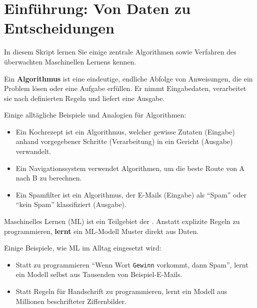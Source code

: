 \chapter{Einführung: Von Daten zu Entscheidungen}
\label{chap:einfuehrung}

In diesem Skript lernen Sie einige zentrale Algorithmen sowie Verfahren des überwachten Maschinellen Lernens kennen.

\begin{mydefinition}[Algorithmus]
Ein \textbf{Algorithmus} ist eine eindeutige, endliche Abfolge von Anweisungen, die ein Problem lösen oder eine Aufgabe erfüllen. Er nimmt Eingabedaten, verarbeitet sie nach definierten Regeln und liefert eine Ausgabe.
\end{mydefinition}

\begin{myexample}
Einige alltägliche Beispiele und Analogien für Algorithmen:
\begin{itemize}
    \item Ein Kochrezept ist ein Algorithmus, welcher gewisse Zutaten (Eingabe) anhand vorgegebener Schritte (Verarbeitung) in ein Gericht (Ausgabe) verwandelt.
    \item Ein Navigationssystem verwendet Algorithmen, um die beste Route von A nach B zu berechnen.
    \item Ein Spamfilter ist ein Algorithmus, der E-Mails (Eingabe) als \enquote{Spam} oder \enquote{kein Spam} klassifiziert (Ausgabe).
\end{itemize}
\end{myexample}

\begin{mydefinition}[\acrfull{ML}]
Maschinelles Lernen (\acrshort{ML}) ist ein Teilgebiet der .
Anstatt explizite Regeln zu programmieren, \textbf{lernt} ein \gls{ML}-Modell
Muster direkt aus Daten.
\end{mydefinition}

\begin{myexample}
    Einige Beispiele, wie \gls{ML} im Alltag eingesetzt wird:
\begin{itemize}
    \item Statt zu programmieren \enquote{Wenn Wort \texttt{Gewinn} vorkommt, dann Spam},
          lernt ein Modell selbst aus Tausenden von Beispiel-E-Mails.
    \item Statt Regeln für Handschrift zu programmieren, lernt ein Modell aus Millionen beschrifteter Ziffernbilder.
\end{itemize}
\end{myexample}

